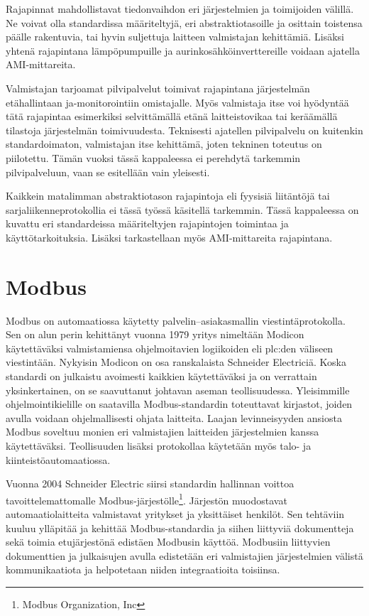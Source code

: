 Rajapinnat mahdollistavat tiedonvaihdon eri järjestelmien ja toimijoiden välillä. Ne voivat olla standardissa määriteltyjä, eri abstraktiotasoille ja osittain toistensa päälle rakentuvia, tai hyvin suljettuja laitteen valmistajan kehittämiä. Lisäksi yhtenä rajapintana lämpöpumpuille ja aurinkosähköinverttereille voidaan ajatella AMI-mittareita.

Valmistajan tarjoamat pilvipalvelut toimivat rajapintana järjestelmän etähallintaan ja\linebreak -monitorointiin omistajalle. Myös valmistaja itse voi hyödyntää tätä rajapintaa esimerkiksi selvittämällä etänä laitteistovikaa tai keräämällä tilastoja järjestelmän toimivuudesta. Teknisesti ajatellen pilvipalvelu on kuitenkin standardoimaton, valmistajan itse kehittämä, joten tekninen toteutus on piilotettu. Tämän vuoksi tässä kappaleessa ei perehdytä tarkemmin pilvipalveluun, vaan se esitellään vain yleisesti.

Kaikkein matalimman abstraktiotason rajapintoja eli fyysisiä liitäntöjä tai sarjaliikenneprotokollia ei tässä työssä käsitellä tarkemmin. Tässä kappaleessa on kuvattu eri standardeissa määriteltyjen rajapintojen toimintaa ja käyttötarkoituksia. Lisäksi tarkastellaan myös \gls{AMI}-mittareita rajapintana.

\section{Modbus}

  Modbus on automaatiossa käytetty palvelin--asiakasmallin viestintäprotokolla. Sen on alun perin kehittänyt vuonna 1979 yritys nimeltään Modicon käytettäväksi valmistamiensa ohjelmoitavien logiikoiden eli \Gls{plc}:den väliseen viestintään. Nykyisin Modicon on osa ranskalaista Schneider Electriciä. Koska standardi on julkaistu avoimesti kaikkien käytettäväksi ja on verrattain yksinkertainen, on se saavuttanut johtavan aseman teollisuudessa. Yleisimmille ohjelmointikielille on saatavilla Modbus-standardin toteuttavat kirjastot, joiden avulla voidaan ohjelmallisesti ohjata laitteita. Laajan levinneisyyden ansiosta Modbus soveltuu monien eri valmistajien laitteiden järjestelmien kanssa käytettäväksi. Teollisuuden lisäksi protokollaa käytetään myös talo- ja kiinteistöautomaatiossa. \mbox{\parencite{sousaPortugal, modbusAppSpec, modbusOrg}}

  Vuonna 2004 Schneider Electric siirsi standardin hallinnan voittoa tavoittelemattomalle Modbus-järjestölle\footnote{Modbus Organization, Inc}. Järjestön muodostavat automaatiolaitteita valmistavat yritykset ja yksittäiset henkilöt. Sen tehtäviin kuuluu ylläpitää ja kehittää Modbus-standardia ja siihen liittyviä dokumentteja sekä toimia etujärjestönä edistäen Modbusin käyttöä. Modbusiin liittyvien dokumenttien ja julkaisujen avulla edistetään eri valmistajien järjestelmien välistä kommunikaatiota ja helpotetaan niiden integraatioita toisiinsa. \parencite{modbusOrg}

